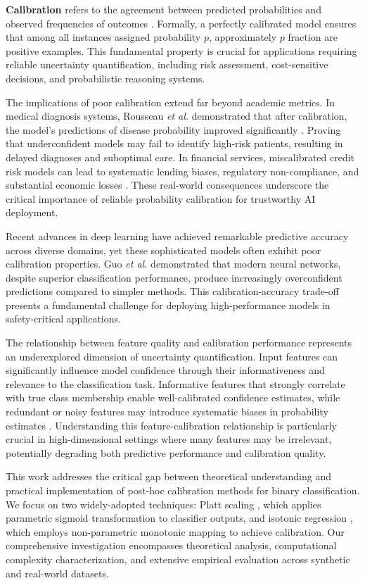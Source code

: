 \documentclass[12pt, a4paper]{article}
\begin{document}
\textbf{Calibration} refers to the agreement between predicted probabilities and observed frequencies of outcomes \cite{dawid1982well}. Formally, a perfectly calibrated model ensures that among all instances assigned probability $p$, approximately $p$ fraction are positive examples. This fundamental property is crucial for applications requiring reliable uncertainty quantification, including risk assessment, cost-sensitive decisions, and probabilistic reasoning systems.

The implications of poor calibration extend far beyond academic metrics. In medical diagnosis systems, Rousseau \emph{et al.} demonstrated that after calibration, the model's predictions of disease probability improved significantly \cite{rousseau2025post}. Proving that underconfident models may fail to identify high-risk patients, resulting in delayed diagnoses and suboptimal care. In financial services, miscalibrated credit risk models can lead to systematic lending biases, regulatory non-compliance, and substantial economic losses \cite{gordy2000comparative}. These real-world consequences underscore the critical importance of reliable probability calibration for trustworthy AI deployment.

Recent advances in deep learning have achieved remarkable predictive accuracy across diverse domains, yet these sophisticated models often exhibit poor calibration properties. Guo \emph{et al.} \cite{guo2017calibration} demonstrated that modern neural networks, despite superior classification performance, produce increasingly overconfident predictions compared to simpler methods. This calibration-accuracy trade-off presents a fundamental challenge for deploying high-performance models in safety-critical applications.

The relationship between feature quality and calibration performance represents an underexplored dimension of uncertainty quantification. Input features can significantly influence model confidence through their informativeness and relevance to the classification task. Informative features that strongly correlate with true class membership enable well-calibrated confidence estimates, while redundant or noisy features may introduce systematic biases in probability estimates \cite{yang2019feature}. Understanding this feature-calibration relationship is particularly crucial in high-dimensional settings where many features may be irrelevant, potentially degrading both predictive performance and calibration quality.

This work addresses the critical gap between theoretical understanding and practical implementation of post-hoc calibration methods for binary classification. We focus on two widely-adopted techniques: Platt scaling \cite{platt1999probabilistic}, which applies parametric sigmoid transformation to classifier outputs, and isotonic regression \cite{zadrozny2001learning}, which employs non-parametric monotonic mapping to achieve calibration. Our comprehensive investigation encompasses theoretical analysis, computational complexity characterization, and extensive empirical evaluation across synthetic and real-world datasets.
\end{document}
